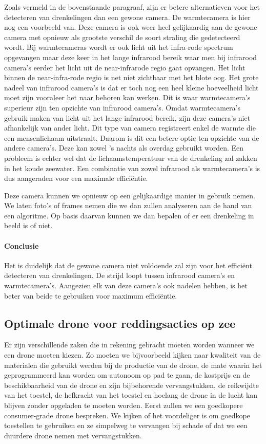 Zoals vermeld in de bovenstaande paragraaf, zijn er betere alternatieven voor het detecteren van drenkelingen dan een gewone camera. De warmtecamera is hier nog een voorbeeld van. Deze camera is ook weer heel gelijkaardig aan de gewone camera met opnieuw als grootste verschil de soort straling die gedetecteerd wordt. Bij warmtecameras wordt er ook licht uit het infra-rode spectrum opgevangen maar deze keer in het lange infrarood bereik waar men bij infrarood camera's eerder het licht uit de near-infrarode regio gaat opvangen. Het licht binnen de near-infra-rode regio is net niet zichtbaar met het blote oog. Het grote nadeel van infrarood camera's is dat er toch nog een heel kleine hoeveelheid licht moet zijn vooraleer het naar behoren kan werken. Dit is waar warmtecamera's superieur zijn ten opzichte van infrarood camera's. Omdat warmtecamera's gebruik maken van licht uit het lange infrarood bereik, zijn deze camera's niet afhankelijk van ander licht. Dit type van camera registreert enkel de warmte die een mensenlichaam uitstraalt. Daarom is dit een betere optie ten opzichte van de andere camera's. Deze kan zowel 's nachts als overdag gebruikt worden. Een probleem is echter wel dat de lichaamstemperatuur van de drenkeling zal zakken in het koude zeewater. Een combinatie van zowel infrarood als warmtecamera's is dus aangeraden voor een maximale efficiëntie.

Deze camera kunnen we opnieuw op een gelijkaardige manier in gebruik nemen. We laten foto's of frames nemen die we dan zullen analyseren aan de hand van een algoritme. Op basis daarvan kunnen we dan bepalen of er een drenkeling in beeld is of niet. 

\paragraph{Conclusie}
Het is duidelijk dat de gewone camera niet voldoende zal zijn voor het efficiënt detecteren van drenkelingen. De strijd loopt tussen infrarood camera's en warmtecamera's. Aangezien elk van deze camera's ook nadelen hebben, is het beter van beide te gebruiken voor maximum efficiëntie.

\subsection{Optimale drone voor reddingsacties op zee}

Er zijn verschillende zaken die in rekening gebracht moeten worden wanneer we een drone moeten kiezen. Zo moeten we bijvoorbeeld kijken naar kwaliteit van de materialen die gebruikt werden bij de productie van de drone, de mate waarin het geprogrammeerd kan worden om autonoom op pad te gaan, de kostprijs en de beschikbaarheid van de drone en zijn bijbehorende vervangstukken, de reikwijdte van het toestel, de hefkracht van het toestel en hoelang de drone in de lucht kan blijven zonder opgeladen te moeten worden. Eerst zullen we een goedkopere consumer-grade drone bespreken. We kijken of het voordeliger is om goedkope toestellen te gebruiken en ze simpelweg te vervangen bij schade of dat we een duurdere drone nemen met vervangstukken.

